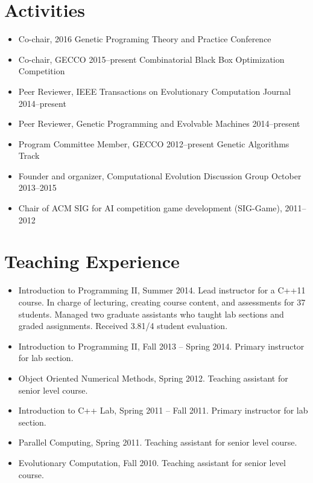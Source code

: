\documentclass[a4paper,11pt]{article}
\begin{document}
\section{Activities}
\begin{itemize}
\item     Co-chair, 2016 Genetic Programing Theory and Practice Conference
\item     Co-chair, GECCO 2015--present Combinatorial Black Box Optimization Competition
\item     Peer Reviewer, IEEE Transactions on Evolutionary Computation Journal 2014--present
\item     Peer Reviewer, Genetic Programming and Evolvable Machines 2014--present
\item     Program Committee Member, GECCO 2012--present Genetic Algorithms Track
\item     Founder and organizer, Computational Evolution Discussion Group October 2013--2015
\item     Chair of ACM SIG for AI competition game development (SIG-Game), 2011--2012
\end{itemize}

\section{Teaching Experience}
\begin{itemize}
\item Introduction to Programming II, Summer 2014.
      Lead instructor for a C++11 course. In charge of lecturing, creating course content, and assessments
      for 37 students. Managed two graduate assistants who taught lab sections and graded assignments.
      Received 3.81/4 student evaluation.
\item Introduction to Programming II, Fall 2013 -- Spring 2014. Primary instructor for lab section.
\item Object Oriented Numerical Methods, Spring 2012. Teaching assistant for senior level course.
\item Introduction to C++ Lab, Spring 2011 -- Fall 2011. Primary instructor for lab section.
\item Parallel Computing, Spring 2011. Teaching assistant for senior level course.
\item Evolutionary Computation, Fall 2010. Teaching assistant for senior level course.
\end{itemize}
\end{document}
